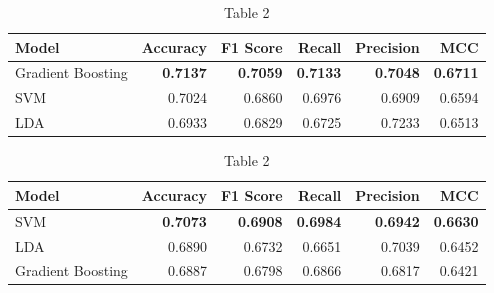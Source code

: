                \newpage 
                \begin{table}[htbp]
                    \centering
                    \begin{minipage}{\linewidth}
                        \centering
                        \begin{tabular}{lrrrrr}
                            \toprule
                            \textbf{Model} & \textbf{Accuracy} & \textbf{F1 Score} & \textbf{Recall} & \textbf{Precision} & \textbf{MCC} \\
                            \midrule
                            Gradient Boosting & \textbf{0.7137} & \textbf{0.7059} & \textbf{0.7133} & \textbf{0.7048} & \textbf{0.6711} \\
                            SVM & 0.7024 & 0.6860 & 0.6976 & 0.6909 & 0.6594 \\
                            LDA & 0.6933 & 0.6829 & 0.6725 & 0.7233 & 0.6513 \\
                            \bottomrule
                        \end{tabular}
                        \caption{Table 1}
                        \vspace{5pt} 
                
                        \begin{tabular}{lrrrrr}
                            \toprule
                            \textbf{Model} & \textbf{Accuracy} & \textbf{F1 Score} & \textbf{Recall} & \textbf{Precision} & \textbf{MCC} \\
                            \midrule
                            SVM & \textbf{0.7073} & \textbf{0.6908} & \textbf{0.6984} & \textbf{0.6942} & \textbf{0.6630} \\
                            LDA & 0.6890 & 0.6732 & 0.6651 & 0.7039 & 0.6452 \\
                            Gradient Boosting & 0.6887 & 0.6798 & 0.6866 & 0.6817 & 0.6421 \\
                            \bottomrule
                        \end{tabular}
                        \caption{Table 2}
                    \end{minipage}
                \end{table}

